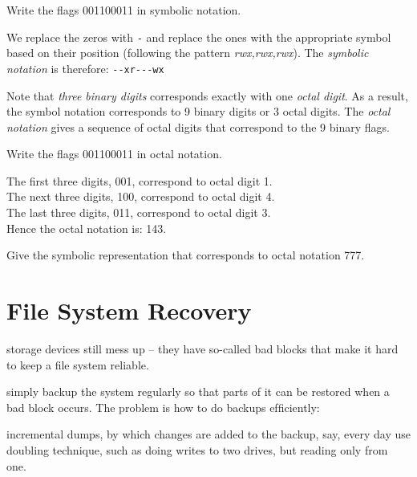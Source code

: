 

\begin{example}
Write the flags 001100011 in symbolic notation.

We replace the zeros with \lstinline{-} and replace the ones with the 
appropriate symbol based on their position 
(following the pattern \textit{rwx,rwx,rwx}). 
The \textit{symbolic notation} is therefore: \lstinline{--xr---wx}

\end{example}

\frmrule


Note that \textit{three binary digits} corresponds exactly with one \textit{octal digit}. 
As a result, the symbol notation corresponds to 9 binary digits or 3 octal digits. 
The \textit{octal notation} gives a sequence of octal digits that correspond to the 
9 binary flags. 

\frmrule

\begin{example}
Write the flags 001100011 in octal notation.

The first three digits, 001, correspond to octal digit 1. \\
The next three digits, 100, correspond to octal digit 4. \\
The last three digits, 011, correspond to octal digit 3. \\
Hence the octal notation is: 143.
\end{example}

\begin{example}
Give the symbolic representation that corresponds to octal notation 777.
\end{example}




\section{File System Recovery}

storage devices still mess up – they have
so-called bad blocks that make it hard to keep a ﬁle
system reliable.

simply backup the system regularly so that
parts of it can be restored when a bad block occurs.
The problem is how to do backups efﬁciently:

incremental dumps, by which changes are added
to the backup, say, every day
use doubling technique, such as doing writes to
two drives, but reading only from one.




